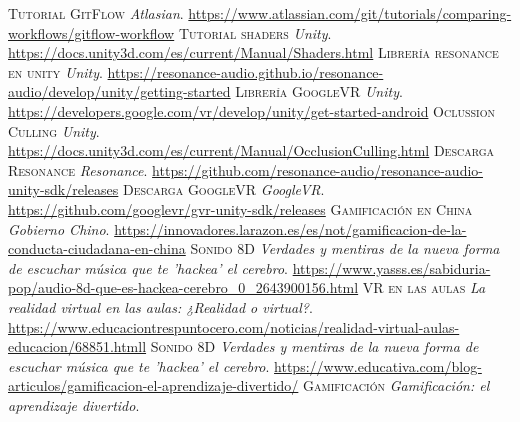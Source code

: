 	\begin{thebibliography}{99}
			\textsc{Tutorial GitFlow}
			\textit{Atlasian}.
			\newline
			\url{https://www.atlassian.com/git/tutorials/comparing-workflows/gitflow-workflow}
			\textsc{Tutorial shaders}
			\textit{Unity}.
			\newline
			\url{https://docs.unity3d.com/es/current/Manual/Shaders.html}
			\textsc{Librería resonance en unity}
			\textit{Unity}.
			\newline
			\url{https://resonance-audio.github.io/resonance-audio/develop/unity/getting-started}
			\textsc{Librería GoogleVR}
			\textit{Unity}.
			\newline
			\url{https://developers.google.com/vr/develop/unity/get-started-android}
			\textsc{Oclussion Culling}
			\textit{Unity}.
			\newline
			\url{https://docs.unity3d.com/es/current/Manual/OcclusionCulling.html}
			\textsc{Descarga Resonance}
			\textit{Resonance}.
			\newline
			\url{https://github.com/resonance-audio/resonance-audio-unity-sdk/releases}
			\textsc{Descarga GoogleVR}
			\textit{GoogleVR}.
			\newline
			\url{https://github.com/googlevr/gvr-unity-sdk/releases}
			\textsc{Gamificación en China}
			\textit{Gobierno Chino}.
			\newline
			\url{https://innovadores.larazon.es/es/not/gamificacion-de-la-conducta-ciudadana-en-china}	
			\textsc{Sonido 8D}
			\textit{Verdades y mentiras de la nueva forma de escuchar música que te 'hackea' el cerebro}.
			\newline
			\url{https://www.yasss.es/sabiduria-pop/audio-8d-que-es-hackea-cerebro_0_2643900156.html}
			\textsc{VR en las aulas}
			\textit{La realidad virtual en las aulas: ¿Realidad o virtual?}.
			\newline
			\url{https://www.educaciontrespuntocero.com/noticias/realidad-virtual-aulas-educacion/68851.htmll}	
			\textsc{Sonido 8D}
			\textit{Verdades y mentiras de la nueva forma de escuchar música que te 'hackea' el cerebro}.
			\newline
			\url{https://www.educativa.com/blog-articulos/gamificacion-el-aprendizaje-divertido/}		
			\textsc{Gamificación}
			\textit{Gamificación: el aprendizaje divertido}.
			\newline

\end{thebibliography}
